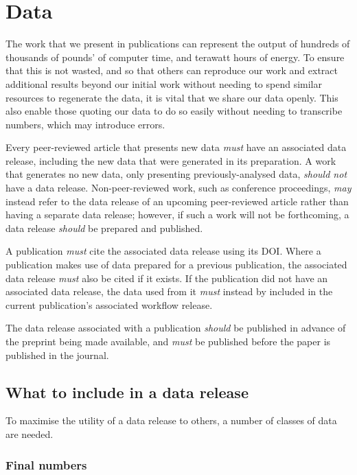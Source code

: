 \documentclass{article}
\newcommand\rfcword[1]{\emph{#1}\xspace}
\newcommand\must{\rfcword{must}}
\newcommand\should{\rfcword{should}}
\newcommand\shouldnot{\rfcword{should not}}
\newcommand\may{\rfcword{may}}
\begin{document}
\section{Data}\label{sec:data}

The work that we present in publications can represent
the output of hundreds of thousands of pounds' of computer time,
and terawatt hours of energy.
To ensure that this is not wasted,
and so that others can reproduce our work
and extract additional results beyond our initial work
without needing to spend similar resources to regenerate the data,
it is vital that we share our data openly.
This also enable those quoting our data to do so easily
without needing to transcribe numbers,
which may introduce errors.

Every peer-reviewed article that presents new data
\must have an associated data release,
including the new data that were generated in its preparation.
A work that generates no new data,
only presenting previously-analysed data,
\shouldnot have a data release.
Non-peer-reviewed work,
such as conference proceedings,
\may instead refer to
the data release of an upcoming peer-reviewed article
rather than having a separate data release;
however,
if such a work will not be forthcoming,
a data release \should be prepared and published.

A publication \must cite the associated data release using its DOI\@.
Where a publication makes use of data prepared for a previous publication,
the associated data release \must also be cited if it exists.
If the publication did not have an associated data release,
the data used from it \must instead by included in
the current publication's associated workflow release.

The data release associated with a publication
\should be published in advance of the preprint being made available,
and \must be published before the paper is published in the journal.

\subsection{What to include in a data release}

To maximise the utility of a data release to others,
a number of classes of data are needed.

\subsubsection{Final numbers}\label{sec:dr-numbers}
\end{document}
